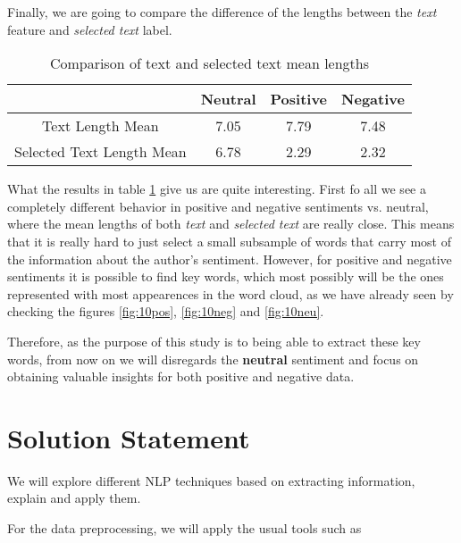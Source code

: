 \documentclass[11pt]{article}
\begin{document}
Finally, we are going to compare the difference of the lengths between the \textit{text} feature and \textit{selected text} label.

\begin{table}[h]
\centering
\begin{tabular}{c|c|c|c}
\hline
\hline
 & Neutral & Positive & Negative \\ \hline
Text Length Mean & 7.05 & 7.79 & 7.48 \\ 
Selected Text Length Mean & 6.78 & 2.29 & 2.32 \\ 
\hline
\hline
\end{tabular}
\caption{Comparison of text and selected text mean lengths}
\label{tab:text-lengths}
\end{table}

What the results in table \ref{tab:text-lengths} give us are quite interesting. First fo all we see a completely different behavior in positive and negative sentiments vs. neutral, where the mean lengths of both \textit{text} and \textit{selected text} are really close. This means that it is really hard to just select a small subsample of words that carry most of the information about the author's sentiment. However, for positive and negative sentiments it is possible to find key words, which most possibly will be the ones represented with most appearences in the word cloud, as we have already seen by checking the figures \ref{fig:10pos}, \ref{fig:10neg} and \ref{fig:10neu}.

Therefore, as the purpose of this study is to being able to extract these key words, from now on we will disregards the \textbf{neutral} sentiment and focus on obtaining valuable insights for both positive and negative data.

\section{Solution Statement}

We will explore different NLP techniques based on extracting information, explain and apply them.

For the data preprocessing, we will apply the usual tools such as 
\end{document}
